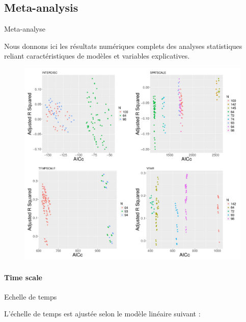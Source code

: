 \subsection{Meta-analysis}{Meta-analyse}

Nous donnons ici les résultats numériques complets des analyses statistiques reliant caractéristiques de modèles et variables explicatives.




\begin{figure}
\includegraphics[width=\linewidth]{Figures/Final/A-quantepistemo-regressions.jpg}
\appcaption{}{\label{fig:app:quantepistemo:regressions}}
\end{figure}



\paragraph{Time scale}{Echelle de temps}

L'échelle de temps est ajustée selon le modèle linéaire suivant :

